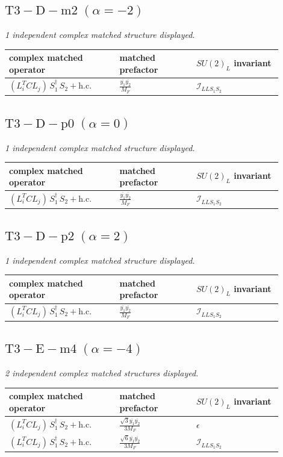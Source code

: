 \documentclass[9pt]{article}
\begin{document}
\subsection*{$ \mathrm{T3-D-m2}\;(\alpha=-2) $}
\textit{1 independent complex matched structure displayed. }
\begin{longtable}{@{}p{0.36\linewidth}p{0.25\linewidth}p{0.29\linewidth}@{}}
\toprule
complex matched operator & matched prefactor & $SU(2)_L$ invariant \\
\midrule
$ (L_i^T C L_j)\,S_1^\dagger\,S_2+\mathrm{h.c.} $ & $ \frac{\overline{y_{1}} \overline{y_{2}}}{M_F} $ & $ \mathcal{I}_{LLS_1S_2} $ \\
\bottomrule
\end{longtable}
\subsection*{$ \mathrm{T3-D-p0}\;(\alpha=0) $}
\textit{1 independent complex matched structure displayed. }
\begin{longtable}{@{}p{0.36\linewidth}p{0.25\linewidth}p{0.29\linewidth}@{}}
\toprule
complex matched operator & matched prefactor & $SU(2)_L$ invariant \\
\midrule
$ (L_i^T C L_j)\,S_1^\dagger\,S_2+\mathrm{h.c.} $ & $ \frac{\overline{y_{1}} \overline{y_{2}}}{M_F} $ & $ \mathcal{I}_{LLS_1S_2} $ \\
\bottomrule
\end{longtable}
\subsection*{$ \mathrm{T3-D-p2}\;(\alpha=2) $}
\textit{1 independent complex matched structure displayed. }
\begin{longtable}{@{}p{0.36\linewidth}p{0.25\linewidth}p{0.29\linewidth}@{}}
\toprule
complex matched operator & matched prefactor & $SU(2)_L$ invariant \\
\midrule
$ (L_i^T C L_j)\,S_1^\dagger\,S_2+\mathrm{h.c.} $ & $ \frac{\overline{y_{1}} \overline{y_{2}}}{M_F} $ & $ \mathcal{I}_{LLS_1S_2} $ \\
\bottomrule
\end{longtable}
\subsection*{$ \mathrm{T3-E-m4}\;(\alpha=-4) $}
\textit{2 independent complex matched structures displayed. }
\begin{longtable}{@{}p{0.36\linewidth}p{0.25\linewidth}p{0.29\linewidth}@{}}
\toprule
complex matched operator & matched prefactor & $SU(2)_L$ invariant \\
\midrule
$ (L_i^T C L_j)\,S_1^\dagger\,S_2+\mathrm{h.c.} $ & $ \frac{\sqrt{3} \overline{y_{1}} \overline{y_{2}}}{3 M_F} $ & $ \epsilon $ \\
$ (L_i^T C L_j)\,S_1^\dagger\,S_2+\mathrm{h.c.} $ & $ \frac{\sqrt{6} \overline{y_{1}} \overline{y_{2}}}{3 M_F} $ & $ \mathcal{I}_{LLS_1S_2} $ \\
\bottomrule
\end{longtable}
\end{document}
